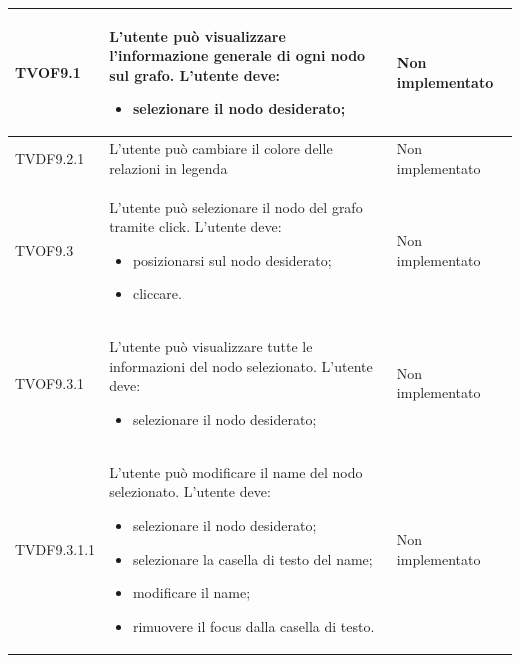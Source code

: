 \documentclass[openany,12pt,a4paper]{report}
\begin{document}
\begin{longtable}{| p{2cm} |p{5cm} | p{2.5cm} |}
	
	\newline TVOF9.1&
	\newline L'utente può visualizzare l'informazione generale di ogni nodo sul grafo. L'utente deve:
	\begin{itemize}
		\item selezionare il nodo desiderato;
	\end{itemize}&
	\newline Non implementato
	\\[1em]
	\hline
	
	\newline TVDF9.2.1&
	\newline L'utente può cambiare il colore delle relazioni in legenda&
	\newline  Non implementato
	\\[1em]
	\hline
	
	\newline TVOF9.3&
	\newline L'utente può selezionare il nodo del grafo tramite click. L'utente deve:
	\begin{itemize}
		\item posizionarsi sul nodo desiderato;
		\item cliccare.
	\end{itemize}&
	\newline Non implementato
	\\[1em]
	\hline
	
	\newline TVOF9.3.1&
	\newline L'utente può visualizzare tutte le informazioni del nodo selezionato. L'utente deve:
	\begin{itemize}
		\item selezionare il nodo desiderato;
	\end{itemize}&
	\newline Non implementato
	\\[1em]
	\hline
	
	\newline TVDF9.3.1.1&
	\newline L'utente può modificare il name del nodo selezionato. L'utente deve:
	\begin{itemize}
		\item selezionare il nodo desiderato;
		\item selezionare la casella di testo del name;
		\item modificare il name;
		\item rimuovere il focus dalla casella di testo.
	\end{itemize}&
	\newline Non implementato
	\\[1em]
	\hline
	

\end{longtable}
\end{document}
